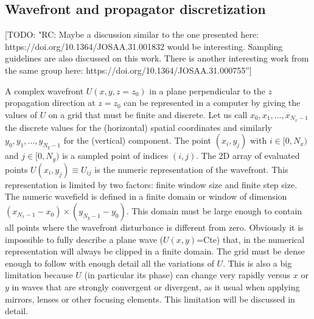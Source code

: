 \documentclass{iucr}              %
\newcommand{\todo}[1]{{\color{red}[TODO: "#1'']}}
\begin{document}
\subsection{Wavefront and propagator discretization}
\label{subch: discretization}
\todo{RC: Maybe a discussion similar to the one presented here: https://doi.org/10.1364/JOSAA.31.001832 would be interesting. Sampling guidelines are also discussed on this work. There is another interesting work from the same group here: https://doi.org/10.1364/JOSAA.31.000755}

A complex wavefront $U(x,y,z=z_0)$ in a plane perpendicular to the $z$ propagation direction at $z=z_0$ can be represented in a computer by giving the values of $U$ on a grid that must be finite and discrete. Let us call ${x_0,x_1,...,x_{N_x-1}}$ the discrete values for the (horizontal) spatial coordinates and similarly  ${y_0,y_1,...,y_{N_y-1}}$ for the (vertical) component. The point $(x_i,y_j)$ with $i \in [0,N_x)$ and  $j \in [0,N_y)$ is a sampled point of indices $(i,j)$. The 2D array of evaluated points $U(x_i,y_j) \equiv U_{ij}$ is the numeric representation of the wavefront. This representation is limited by two factors: finite window size and finite step size. The numeric wavefield is defined in a finite domain or window of dimension $(x_{N_x-1}-x_0) \times (y_{N_y-1}-y_0)$. This domain must be large enough to contain all points where the wavefront disturbance is different from zero. Obviously it is impossible to fully describe a plane wave ($U(x,y)$=Cte) that, in the numerical representation will always be clipped in a finite domain. The grid must be dense enough to follow with enough detail all the variations of $U$. This is also a big limitation because $U$ (in particular its phase) can change very rapidly versus $x$ or $y$ in waves that are strongly convergent or divergent, as it usual when applying mirrors, lenses or other focusing elements. This limitation will be discussed in detail. 
\end{document}
